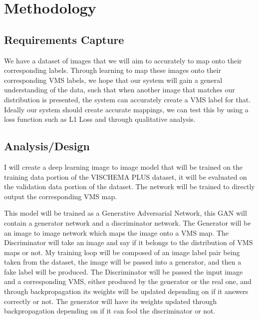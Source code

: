 \documentclass[11pt]{article}
\begin{document}
\newpage{}

\section{Methodology}




\subsection{Requirements Capture}

We have a dataset of images that we will aim to accurately to map onto their corresponding labels. Through learning to map these images onto their corresponding VMS labels, we hope that our system will gain a general understanding of the data, such that when another image that matches our distribution is presented, the system can accurately create a VMS label for that. Ideally our system should create accurate mappings, we can test this by using a loss function such as L1 Loss and through qualitative analysis. 

\subsection{Analysis/Design}


I will create a deep learning image to image model that will be trained on the training data portion of the VISCHEMA PLUS dataset, it will be evaluated on the validation data portion of the dataset. The network will be trained to directly output the corresponding VMS map.

This model will be trained as a Generative Adversarial Network, this GAN will contain a generator network and a discriminator network. The Generator will be an image to image network which maps the image onto a VMS map. The Discriminator will take an image and say if it belongs to the distribution of VMS maps or not. My training loop will be composed of an image label pair being taken from the dataset, the image will be passed into a generator, and then a fake label will be produced. The Discriminator will be passed the input image and a corresponding VMS, either produced by the generator or the real one, and through backpropagation its weights will be updated depending on if it answers correctly or not. The generator will have its weights updated through backpropagation depending on if it can fool the discriminator or not. 
\end{document}
